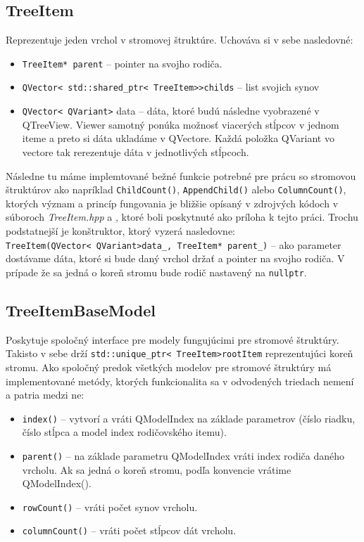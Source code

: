 \subsection{TreeItem}
\label{kap04:sec:tree_item}
Reprezentuje jeden vrchol v stromovej štruktúre. Uchováva si v sebe nasledovné:
\begin{itemize}
\item \texttt{TreeItem* parent} -- pointer na svojho rodiča.
\item \texttt{QVector\textless~std::shared\_ptr\textless~TreeItem\textgreater\textgreater childs} -- list svojich synov
\item \texttt{QVector\textless~QVariant\textgreater} data -- dáta, ktoré budú následne vyobrazené v QTreeView. Viewer samotný ponúka možnosť viacerých stĺpcov v jednom iteme a preto si dáta ukladáme v QVectore. Každá položka QVariant vo vectore tak rerezentuje dáta v jednotlivých stĺpcoch.
\end{itemize} 

Následne tu máme implemtované bežné funkcie potrebné pre prácu so stromovou štruktúrov ako napríklad \texttt{ChildCount()}, \texttt{AppendChild()} alebo \texttt{Column\-Count()}, ktorých význam a princíp fungovania je bližšie opísaný v zdrojvých kódoch v súboroch \textit{TreeItem.hpp} a , ktoré boli poskytnuté ako príloha k tejto práci.
Trochu podstatnejší je konštruktor, ktorý vyzerá nasledovne:
\texttt{TreeItem(QVector\textless~QVariant\textgreater data\_, TreeItem* parent\_)} -- ako parameter dostávame dáta, ktoré si bude daný vrchol držať a pointer na svojho rodiča. V prípade že sa jedná o koreň stromu bude rodič nastavený na \texttt{nullptr}.



\subsection{TreeItemBaseModel}
Poskytuje spoločný interface pre modely fungujúcimi pre stromové štruktúry. Takisto v sebe drží \texttt{std::unique\_ptr\textless~TreeItem\textgreater rootItem} reprezentujúci koreň stromu.  Ako spoločný predok všetkých modelov pre stromové štruktúry má implementované metódy, ktorých funkcionalita sa v odvodených triedach nemení a patria medzi ne:
\begin{itemize}
\item \texttt{index()} -- vytvorí a vráti QModelIndex na základe parametrov (číslo riad\-ku, číslo stĺpca a model index rodičovského itemu).
\item \texttt{parent()} -- na základe parametru QModelIndex vráti index rodiča daného vrcholu. Ak sa jedná o koreň stromu, podľa konvencie vrátime QModelIndex().
\item \texttt{rowCount()} -- vráti počet synov vrcholu.
\item \texttt{columnCount()} -- vráti počet stĺpcov dát vrcholu.
\end{itemize}
 
